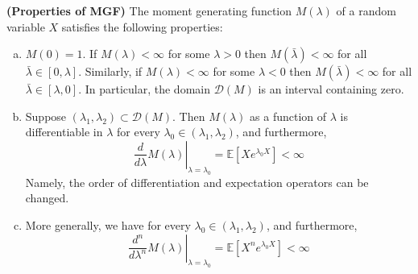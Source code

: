 \documentclass{article}
\newcommand{\bfs}[1]{\textbf{({#1})}}
\begin{document}
\begin{lema}{\bfs{Properties of MGF}}\label{ld:mgf}
The moment generating function $M(\lambda)$ of a random variable $X$ satisfies the following properties:
\begin{enumerate}[(a)]
    \item $M(0)=1$. If $M(\lambda)<\infty$ for some $\lambda>0$ then $M\left(\bar{\lambda}\right)<\infty$ for all $\bar{\lambda} \in[0, \lambda] .$ Similarly, if $M(\lambda)<\infty$ for some $\lambda<0$ then $M\left(\bar{\lambda}\right)<\infty$ for all $\bar{\lambda} \in[\lambda, 0] .$ In particular, the domain $\mathcal{D}(M)$ is an interval containing zero.
    \item Suppose $\left(\lambda_{1}, \lambda_{2}\right) \subset \mathcal{D}(M)$. Then $M(\lambda)$ as a function of $\lambda$ is differentiable in $\lambda$ for every $\lambda_{0} \in\left(\lambda_{1}, \lambda_{2}\right)$, and furthermore,
$$
\left.\frac{d}{d \lambda} M(\lambda)\right|_{\lambda=\lambda_{0}}=\mathbb{E}\left[X e^{\lambda_{0} X}\right]<\infty
$$
Namely, the order of differentiation and expectation operators can be changed.
\item More generally, we have for every $\lambda_{0} \in\left(\lambda_{1}, \lambda_{2}\right)$, and furthermore,
$$
\left.\frac{d^n}{d \lambda^n} M(\lambda)\right|_{\lambda=\lambda_{0}}=\mathbb{E}\left[X^n e^{\lambda_{0} X}\right]<\infty
$$
\end{enumerate}
\end{lema}
\end{document}
